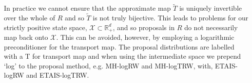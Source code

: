 \documentclass[final]{siamltex}
\newcommand{\edit}[1]{{\color{red} #1}}
\newcommand\irregularcircle[2]{%
  \pgfextra {\pgfmathsetmacro\len{(#1)+rand*(#2)}}
  +(0:\len pt)
  \foreach \a in {10,20,...,350}{
    \pgfextra {\pgfmathsetmacro\len{(#1)+rand*(#2)}}
    -- +(\a:\len pt)
  } -- cycle
}
\begin{document}




In practice we cannot ensure that the approximate map $\tilde{T}$
is uniquely invertible over the whole of $R$ and so $\tilde{T}$ is not
truly bijective. This leads to problems for our strictly positive
state space, $\mathcal{X} \subset \mathbb{R}_+^d$, and so proposals in
$R$ do not necessarily map back onto $\mathcal{X}$. \edit{This can be
  avoided, however, by employing a logarithmic preconditioner for the
  transport map. The proposal distributions are labelled with a T for transport map and when using the intermediate space we prepend `log' to the proposal method, e.g. MH-logRW and MH-logTRW, with, ETAIS-logRW and ETAIS-logTRW.}



\end{document}
